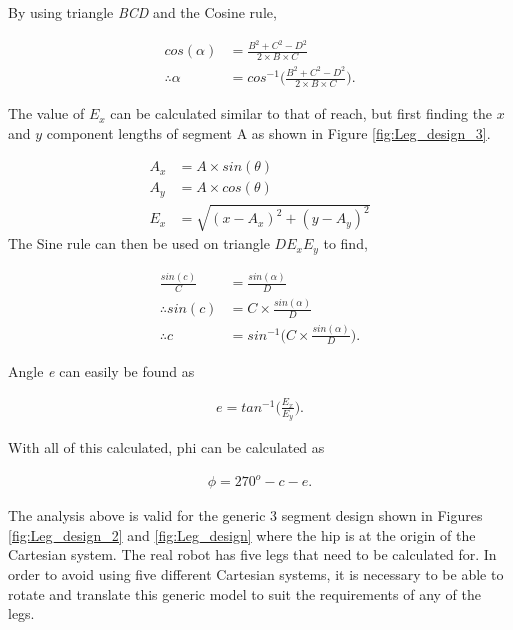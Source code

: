 By using triangle \textit{BCD} and the Cosine rule,

\begin{align}
cos(\alpha) &= \frac{B^2+C^2-D^2}{2\times B\times C}\\
\therefore \alpha &= cos^{-1}\Bigg(\frac{B^2+C^2-D^2}{2\times B\times C}\Bigg).
\end{align}

The value of $E_x$ can be calculated similar to that of reach, but first finding the $x$ and $y$ component lengths of segment A as shown in Figure \ref{fig:Leg_design_3}.

\begin{align}
A_x &= A \times sin(\theta)\\
A_y &= A \times cos(\theta)\\
E_x &= \sqrt{(x-A_x)^2+(y-A_y)^2}
\end{align}
The Sine rule can then be used on triangle $DE_xE_y$ to find,

\begin{align}
\frac{sin(c)}{C} &= \frac{sin(\alpha)}{D}\\
\therefore sin(c) &= C \times \frac{sin(\alpha)}{D}\\
\therefore c &= sin^{-1}\Bigg(C \times \frac{sin(\alpha)}{D}\Bigg).
\end{align}

Angle \textit{e} can easily be found as

\begin{align}
e = tan^{-1}\Bigg(\frac{E_x}{E_y}\Bigg).
\end{align}

With all of this calculated, phi can be calculated as

\begin{align}
\label{eq:IKend}
\phi = 270^o - c -e.
\end{align}

The analysis above is valid for the generic 3 segment design shown in Figures \ref{fig:Leg_design_2} and \ref{fig:Leg_design} where the hip is at the origin of the Cartesian system. The real robot has five legs that need to be calculated for. In order to avoid using five different Cartesian systems, it is necessary to be able to rotate and translate this generic model to suit the requirements of any of the legs.\\

